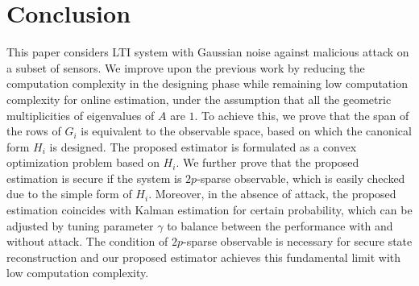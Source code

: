 \documentclass{ieeetrans}   %
\newcommand{\Ic}{{\mathcal{I}}}
\begin{document}
%





\section{Conclusion}\label{sec:conclusion}
This paper considers LTI system with Gaussian noise against malicious attack on a subset of sensors. 
We improve upon the previous work by reducing the computation complexity in the designing phase while remaining low computation complexity for online estimation, under the assumption that all the geometric multiplicities of eigenvalues of $A$ are $1$.
To achieve this, we prove that the span of the rows of $G_i$ is equivalent to the observable space, based on which the canonical form $H_i$ is designed. The proposed estimator is formulated as a convex optimization problem based on $H_i$. We further prove that the proposed estimation is secure if the system is $2p$-sparse observable, which is easily checked due to the simple form of $H_i$. Moreover, in the absence of attack, the proposed estimation coincides with Kalman estimation for certain probability, which can be adjusted by tuning parameter $\gamma$ to balance between the performance with and without attack.
The condition of $2p$-sparse observable is necessary for secure state reconstruction \cite{ShoukryTAC2016} and our proposed estimator achieves this fundamental limit with low computation complexity.
\end{document}

